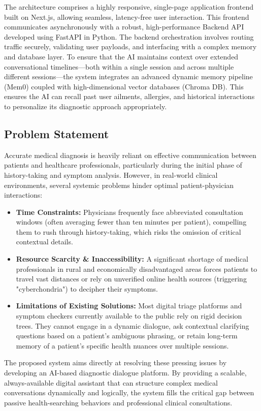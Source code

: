 \documentclass[12pt]{article}
\begin{document}
The architecture comprises a highly responsive, single-page application frontend built on Next.js, allowing seamless, latency-free user interaction. This frontend communicates asynchronously with a robust, high-performance Backend API developed using FastAPI in Python. The backend orchestration involves routing traffic securely, validating user payloads, and interfacing with a complex memory and database layer. To ensure that the AI maintains context over extended conversational timelines—both within a single session and across multiple different sessions—the system integrates an advanced dynamic memory pipeline (Mem0) coupled with high-dimensional vector databases (Chroma DB). This ensures the AI can recall past user ailments, allergies, and historical interactions to personalize its diagnostic approach appropriately.

\subsection{Problem Statement}
Accurate medical diagnosis is heavily reliant on effective communication between patients and healthcare professionals, particularly during the initial phase of history-taking and symptom analysis. However, in real-world clinical environments, several systemic problems hinder optimal patient-physician interactions:
\begin{itemize}
    \item \textbf{Time Constraints:} Physicians frequently face abbreviated consultation windows (often averaging fewer than ten minutes per patient), compelling them to rush through history-taking, which risks the omission of critical contextual details.
    \item \textbf{Resource Scarcity \& Inaccessibility:} A significant shortage of medical professionals in rural and economically disadvantaged areas forces patients to travel vast distances or rely on unverified online health sources (triggering "cyberchondria") to decipher their symptoms.
    \item \textbf{Limitations of Existing Solutions:} Most digital triage platforms and symptom checkers currently available to the public rely on rigid decision trees. They cannot engage in a dynamic dialogue, ask contextual clarifying questions based on a patient's ambiguous phrasing, or retain long-term memory of a patient's specific health nuances over multiple sessions.
\end{itemize}
The proposed system aims directly at resolving these pressing issues by developing an AI-based diagnostic dialogue platform. By providing a scalable, always-available digital assistant that can structure complex medical conversations dynamically and logically, the system fills the critical gap between passive health-searching behaviors and professional clinical consultations.
\end{document}
